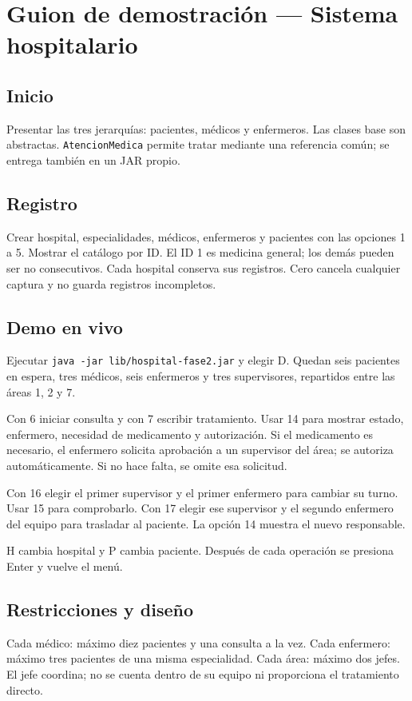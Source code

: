 \documentclass[12pt]{article}
\begin{document}
\section*{Guion de demostración — Sistema hospitalario}
\subsection*{Inicio}
Presentar las tres jerarquías: pacientes, médicos y enfermeros. Las clases base son abstractas. \texttt{AtencionMedica} permite tratar mediante una referencia común; se entrega también en un JAR propio.

\subsection*{Registro}
Crear hospital, especialidades, médicos, enfermeros y pacientes con las opciones 1 a 5. Mostrar el catálogo por ID. El ID 1 es medicina general; los demás pueden ser no consecutivos. Cada hospital conserva sus registros. Cero cancela cualquier captura y no guarda registros incompletos.

\subsection*{Demo en vivo}
Ejecutar \texttt{java -jar lib/hospital-fase2.jar} y elegir D. Quedan seis pacientes en espera, tres médicos, seis enfermeros y tres supervisores, repartidos entre las áreas 1, 2 y 7.

Con 6 iniciar consulta y con 7 escribir tratamiento. Usar 14 para mostrar estado, enfermero, necesidad de medicamento y autorización. Si el medicamento es necesario, el enfermero solicita aprobación a un supervisor del área; se autoriza automáticamente. Si no hace falta, se omite esa solicitud.

Con 16 elegir el primer supervisor y el primer enfermero para cambiar su turno. Usar 15 para comprobarlo. Con 17 elegir ese supervisor y el segundo enfermero del equipo para trasladar al paciente. La opción 14 muestra el nuevo responsable.

H cambia hospital y P cambia paciente. Después de cada operación se presiona Enter y vuelve el menú.

\subsection*{Restricciones y diseño}
Cada médico: máximo diez pacientes y una consulta a la vez. Cada enfermero: máximo tres pacientes de una misma especialidad. Cada área: máximo dos jefes. El jefe coordina; no se cuenta dentro de su equipo ni proporciona el tratamiento directo.
\end{document}

